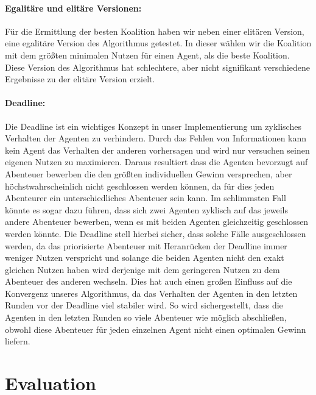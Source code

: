 \documentclass[fleqn,10pt]{SelfArx} %
\begin{document}
\paragraph{Egalitäre und elitäre Versionen:} Für die Ermittlung der besten Koalition haben wir neben einer elitären Version, eine egalitäre Version des Algorithmus getestet. In dieser wählen wir die Koalition mit dem größten minimalen Nutzen für einen Agent, als die beste Koalition. Diese Version des Algorithmus hat schlechtere, aber nicht signifikant verschiedene Ergebnisse zu der elitäre Version erzielt.


\paragraph{Deadline:}
Die Deadline ist ein wichtiges Konzept in unser Implementierung um zyklisches Verhalten der Agenten zu verhindern. Durch das Fehlen von Informationen kann kein Agent das Verhalten der anderen vorhersagen und wird nur versuchen seinen eigenen Nutzen zu maximieren. Daraus resultiert dass die Agenten bevorzugt auf Abenteuer bewerben die den größten individuellen Gewinn versprechen, aber höchstwahrscheinlich nicht geschlossen werden können, da für dies jeden Abenteurer ein unterschiedliches Abenteuer sein kann. Im schlimmsten Fall könnte es sogar dazu führen, dass sich zwei Agenten zyklisch auf das jeweils andere Abenteuer bewerben, wenn es mit beiden Agenten gleichzeitig geschlossen werden könnte. Die Deadline stell hierbei sicher, dass solche Fälle ausgeschlossen werden, da das priorisierte Abenteuer mit Heranrücken der Deadline immer weniger Nutzen verspricht und solange die beiden Agenten nicht den exakt gleichen Nutzen haben wird derjenige mit dem geringeren Nutzen zu dem Abenteuer des anderen wechseln. Dies hat auch einen großen Einfluss auf die Konvergenz unseres Algorithmus, da das Verhalten der Agenten in den letzten Runden vor der Deadline viel stabiler wird. So wird sichergestellt, dass die Agenten in den letzten Runden so viele Abenteuer wie möglich abschließen, obwohl diese Abenteuer für jeden einzelnen Agent nicht einen optimalen Gewinn liefern.

\section{Evaluation}
\label{sec:Evaluation}
\end{document}
